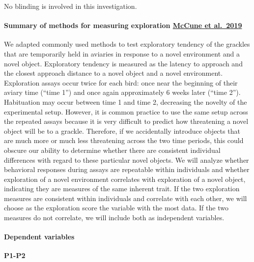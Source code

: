 \documentclass[
]{article}
\begin{document}
No blinding is involved in this investigation.

\hypertarget{summary-of-methods-for-measuring-exploration-mccune-et-al.-2019}{%
\paragraph{\texorpdfstring{Summary of methods for measuring exploration
\href{http://corinalogan.com/Preregistrations/g_exploration.html}{McCune
et
al.~2019}}{Summary of methods for measuring exploration McCune et al.~2019}}\label{summary-of-methods-for-measuring-exploration-mccune-et-al.-2019}}

We adapted commonly used methods to test exploratory tendency of the
grackles that are temporarily held in aviaries in response to a novel
environment and a novel object. Exploratory tendency is measured as the
latency to approach and the closest approach distance to a novel object
and a novel environment. Exploration assays occur twice for each bird:
once near the beginning of their aviary time (``time 1'') and once again
approximately 6 weeks later (``time 2''). Habituation may occur between
time 1 and time 2, decreasing the novelty of the experimental setup.
However, it is common practice to use the same setup across the repeated
assays because it is very difficult to predict how threatening a novel
object will be to a grackle. Therefore, if we accidentally introduce
objects that are much more or much less threatening across the two time
periods, this could obscure our ability to determine whether there are
consistent individual differences with regard to these particular novel
objects. We will analyze whether behavioral responses during assays are
repeatable within individuals and whether exploration of a novel
environment correlates with exploration of a novel object, indicating
they are measures of the same inherent trait. If the two exploration
measures are consistent within individuals and correlate with each
other, we will choose as the exploration score the variable with the
most data. If the two measures do not correlate, we will include both as
independent variables.

\hypertarget{dependent-variables}{%
\paragraph{Dependent variables}\label{dependent-variables}}

\textbf{P1-P2}
\end{document}
